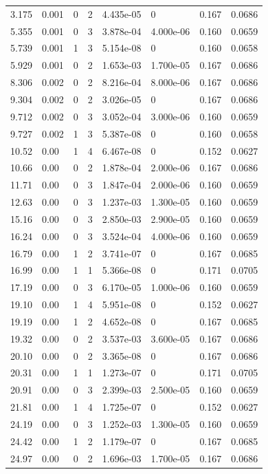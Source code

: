 \documentclass[preview]{standalone}
\begin{document}
{{\begin{tabular}{L{1.2cm}C{1.2cm} C{0.3cm}C{0.5cm} C{1.4cm}C{1.4cm} C{1.4cm}C{1.4cm}}
  3.175  &  0.001  & 0     &  2 &  4.435e-05  & 0  & 0.167 &  0.0686   \\ 
  5.355  &  0.001  & 0     &  3 &  3.878e-04  & 4.000e-06  & 0.160 &  0.0659   \\ 
  5.739  &  0.001  & 1     &  3 &  5.154e-08  & 0  & 0.160 &  0.0658   \\ 
  5.929  &  0.001  & 0     &  2 &  1.653e-03  & 1.700e-05  & 0.167 &  0.0686   \\ 
  8.306  &  0.002  & 0     &  2 &  8.216e-04  & 8.000e-06  & 0.167 &  0.0686   \\ 
  9.304  &  0.002  & 0     &  2 &  3.026e-05  & 0  & 0.167 &  0.0686   \\ 
  9.712  &  0.002  & 0     &  3 &  3.052e-04  & 3.000e-06  & 0.160 &  0.0659   \\ 
  9.727  &  0.002  & 1     &  3 &  5.387e-08  & 0  & 0.160 &  0.0658   \\ 
  10.52  &  0.00  & 1     &  4 &  6.467e-08  & 0  & 0.152 &  0.0627   \\ 
  10.66  &  0.00  & 0     &  2 &  1.878e-04  & 2.000e-06  & 0.167 &  0.0686   \\ 
  11.71  &  0.00  & 0     &  3 &  1.847e-04  & 2.000e-06  & 0.160 &  0.0659   \\ 
  12.63  &  0.00  & 0     &  3 &  1.237e-03  & 1.300e-05  & 0.160 &  0.0659   \\ 
  15.16  &  0.00  & 0     &  3 &  2.850e-03  & 2.900e-05  & 0.160 &  0.0659   \\ 
  16.24  &  0.00  & 0     &  3 &  3.524e-04  & 4.000e-06  & 0.160 &  0.0659   \\ 
  16.79  &  0.00  & 1     &  2 &  3.741e-07  & 0  & 0.167 &  0.0685   \\ 
  16.99  &  0.00  & 1     &  1 &  5.366e-08  & 0  & 0.171 &  0.0705   \\ 
  17.19  &  0.00  & 0     &  3 &  6.170e-05  & 1.000e-06  & 0.160 &  0.0659   \\ 
  19.10  &  0.00  & 1     &  4 &  5.951e-08  & 0  & 0.152 &  0.0627   \\ 
  19.19  &  0.00  & 1     &  2 &  4.652e-08  & 0  & 0.167 &  0.0685   \\ 
  19.32  &  0.00  & 0     &  2 &  3.537e-03  & 3.600e-05  & 0.167 &  0.0686   \\ 
  20.10  &  0.00  & 0     &  2 &  3.365e-08  & 0  & 0.167 &  0.0686   \\ 
  20.31  &  0.00  & 1     &  1 &  1.273e-07  & 0  & 0.171 &  0.0705   \\ 
  20.91  &  0.00  & 0     &  3 &  2.399e-03  & 2.500e-05  & 0.160 &  0.0659   \\ 
  21.81  &  0.00  & 1     &  4 &  1.725e-07  & 0  & 0.152 &  0.0627   \\ 
  24.19  &  0.00  & 0     &  3 &  1.252e-03  & 1.300e-05  & 0.160 &  0.0659   \\ 
  24.42  &  0.00  & 1     &  2 &  1.179e-07  & 0  & 0.167 &  0.0685   \\ 
  24.97  &  0.00  & 0     &  2 &  1.696e-03  & 1.700e-05  & 0.167 &  0.0686   \\ 
\hline 
\end{tabular} 

}}
\end{document}
